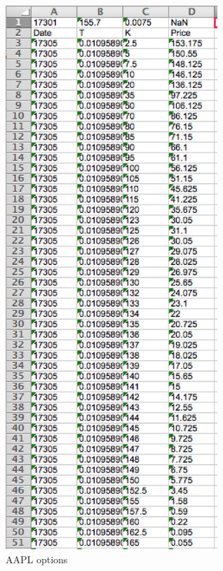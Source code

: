 \documentclass{article}
\begin{document}
\begin{figure}[h] 
\begin{center} 
\includegraphics[width = 8cm]{AAPL.png}  
\caption{AAPL options} 
\end{center} 
\end{figure}
\end{document}
